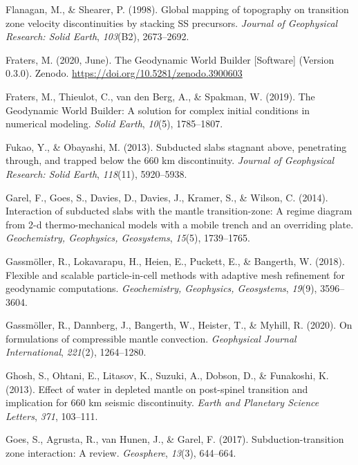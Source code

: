 \documentclass[draft,linenumbers]{agujournal2019}
\newlength{\cslhangindent}
\newenvironment{CSLReferences}[2]
 {\begin{list}{}{
  \setlength{\itemindent}{0pt}
  \setlength{\leftmargin}{0pt}
  \setlength{\parsep}{0pt}
  \ifodd #1
   \setlength{\leftmargin}{\cslhangindent}
   \setlength{\itemindent}{-\cslhangindent}
  \fi
  \setlength{\itemsep}{#2\baselineskip}
  }
  \item\relax}
 {\end{list}}
\begin{document}
\begin{CSLReferences}{1}{0}
Flanagan, M., \& Shearer, P. (1998). Global mapping of topography on
transition zone velocity discontinuities by stacking {SS} precursors.
\emph{Journal of Geophysical Research: Solid Earth}, \emph{103}(B2),
2673--2692.

Fraters, M. (2020, June). {The Geodynamic World Builder {[}Software{]}}
(Version 0.3.0). Zenodo. \url{https://doi.org/10.5281/zenodo.3900603}

{Fraters, M., Thieulot, C., van den Berg, A., \& Spakman, W.} (2019).
The {Geodynamic World Builder}: A solution for complex initial
conditions in numerical modeling. \emph{Solid Earth}, \emph{10}(5),
1785--1807.

Fukao, Y., \& Obayashi, M. (2013). Subducted slabs stagnant above,
penetrating through, and trapped below the 660 km discontinuity.
\emph{Journal of Geophysical Research: Solid Earth}, \emph{118}(11),
5920--5938.

Garel, F., Goes, S., Davies, D., Davies, J., Kramer, S., \& Wilson, C.
(2014). Interaction of subducted slabs with the mantle transition-zone:
A regime diagram from 2-d thermo-mechanical models with a mobile trench
and an overriding plate. \emph{Geochemistry, Geophysics, Geosystems},
\emph{15}(5), 1739--1765.

Gassmöller, R., Lokavarapu, H., Heien, E., Puckett, E., \& Bangerth, W.
(2018). Flexible and scalable particle-in-cell methods with adaptive
mesh refinement for geodynamic computations. \emph{Geochemistry,
Geophysics, Geosystems}, \emph{19}(9), 3596--3604.

Gassmöller, R., Dannberg, J., Bangerth, W., Heister, T., \& Myhill, R.
(2020). On formulations of compressible mantle convection.
\emph{Geophysical Journal International}, \emph{221}(2), 1264--1280.

Ghosh, S., Ohtani, E., Litasov, K., Suzuki, A., Dobson, D., \&
Funakoshi, K. (2013). Effect of water in depleted mantle on post-spinel
transition and implication for 660 km seismic discontinuity. \emph{Earth
and Planetary Science Letters}, \emph{371}, 103--111.

{Goes, S., Agrusta, R., van Hunen, J., \& Garel, F.} (2017).
Subduction-transition zone interaction: A review. \emph{Geosphere},
\emph{13}(3), 644--664.


\end{CSLReferences}
\end{document}
